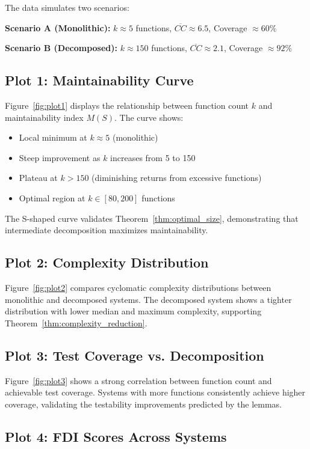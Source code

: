 \documentclass[a4paper,12pt]{article}
\theoremstyle{definition}
\begin{document}
The data simulates two scenarios:

\textbf{Scenario A (Monolithic):} $k \approx 5$ functions, $\overline{CC} \approx 6.5$, Coverage $\approx 60\%$

\textbf{Scenario B (Decomposed):} $k \approx 150$ functions, $\overline{CC} \approx 2.1$, Coverage $\approx 92\%$

\subsection{Plot 1: Maintainability Curve}

Figure~\ref{fig:plot1} displays the relationship between function count $k$ and maintainability index $M(S)$. The curve shows:

\begin{itemize}
	\item Local minimum at $k \approx 5$ (monolithic)
	\item Steep improvement as $k$ increases from 5 to 150
	\item Plateau at $k > 150$ (diminishing returns from excessive functions)
	\item Optimal region at $k \in [80, 200]$ functions
\end{itemize}

The S-shaped curve validates Theorem~\ref{thm:optimal_size}, demonstrating that intermediate decomposition maximizes maintainability.

\subsection{Plot 2: Complexity Distribution}

Figure~\ref{fig:plot2} compares cyclomatic complexity distributions between monolithic and decomposed systems. The decomposed system shows a tighter distribution with lower median and maximum complexity, supporting Theorem~\ref{thm:complexity_reduction}.

\subsection{Plot 3: Test Coverage vs. Decomposition}

Figure~\ref{fig:plot3} shows a strong correlation between function count and achievable test coverage. Systems with more functions consistently achieve higher coverage, validating the testability improvements predicted by the lemmas.

\subsection{Plot 4: FDI Scores Across Systems}
\end{document}
